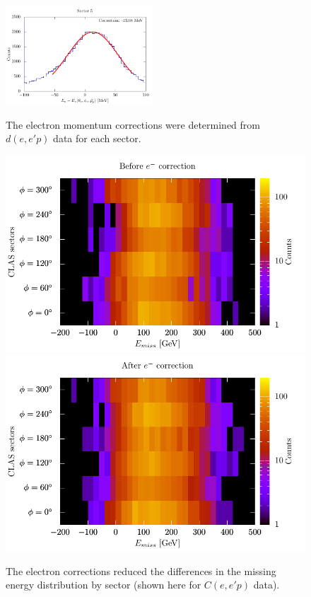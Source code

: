 \documentclass{article}
\begin{document}
\begin{figure}[p]
\includegraphics[width=0.49\textwidth]{Ecorr/corr_5.pdf}\\
\caption{
The electron momentum corrections were determined from $d(e,e'p)$ data for each sector.
\label{fig:E_corr}}
\end{figure}

\begin{figure}[p]
\centering
\includegraphics{Ecorr/Emiss_2d_uncorr.pdf}\\
\includegraphics{Ecorr/Emiss_2d_corr.pdf}
\caption{
The electron corrections reduced the differences in the missing energy distribution
by sector (shown here for $C(e,e'p)$ data).
\label{fig:Emiss_2d}}
\end{figure}
\end{document}
